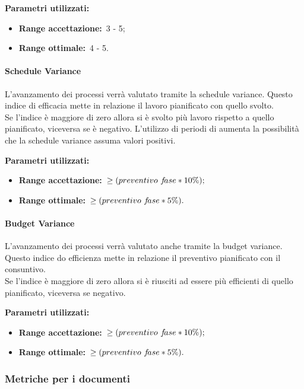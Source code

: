 				\textbf{Parametri utilizzati:}
				\begin{itemize}
					\item \textbf{Range accettazione:}\ 3 - 5;
					\item \textbf{Range ottimale:}\ 4 - 5.
				\end{itemize}
			\paragraph{Schedule Variance}
				L'avanzamento dei processi verrà valutato tramite la schedule variance. Questo indice di efficacia mette in relazione il lavoro pianificato con quello svolto. \\
				Se l'indice è maggiore di zero allora si è svolto più lavoro rispetto a quello pianificato, viceversa se è negativo. L'utilizzo di periodi di  aumenta la possibilità che la schedule variance assuma valori positivi.
				
				\textbf{Parametri utilizzati:}
				\begin{itemize}
					\item \textbf{Range accettazione:}\ $\ge\-(preventivo\,\, f\!ase*10\%);$
					\item \textbf{Range ottimale:}\ $\ge\-(preventivo\,\, f\!ase*5\%).$
				\end{itemize}
				\label{sec:3.7.1.2}
			\paragraph{Budget Variance}
				\label{sec:3.7.1.3}
				L'avanzamento dei processi verrà valutato anche tramite la budget variance. Questo indice do efficienza mette in relazione il preventivo pianificato con il consuntivo. \\
				Se l'indice è maggiore di zero allora si è riusciti ad essere più efficienti di quello pianificato, viceversa se negativo.
				
				\textbf{Parametri utilizzati:}
				\begin{itemize}
					\item \textbf{Range accettazione:}\ $\ge\-(preventivo\,\, f\!ase*10\%);$
					\item \textbf{Range ottimale:}\ $\ge\-(preventivo\,\, f\!ase*5\%).$
				\end{itemize}
		\subsubsection{Metriche per i documenti}
			\label{sec:3.7.2}
